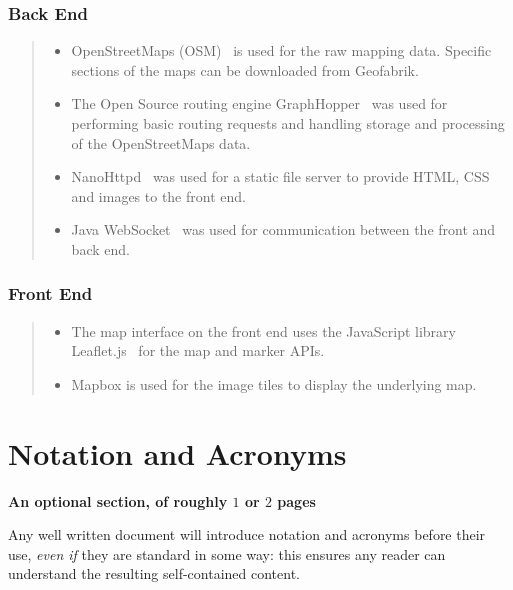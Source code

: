 \documentclass[ draft,
                    author={Alexander Hill},
                supervisor={Dr. Benjamin Sach},
                    degree={MEng},
                     title={MARMOSET: Multi Agent Real-time Multi-core Online
                     Simulation for Efficient Transportation},
                  subtitle={},
                      type={research},
                      year={2016} ]{dissertation}
\begin{document}
\subsection*{Back End}
\begin{quote}
\noindent
\begin{itemize}
    \item OpenStreetMaps (OSM)~\cite{osm} is used for the raw mapping data. Specific sections of
        the maps can be downloaded from Geofabrik.
    \item The Open Source routing engine GraphHopper~\cite{graphhopper} was
        used for performing basic routing requests and handling storage and
        processing of the OpenStreetMaps data.
    \item NanoHttpd~\cite{nanohttpd} was used for a static file server to
        provide HTML, CSS and images to the front end.
    \item Java WebSocket~\cite{javawebsocket} was used for communication
        between the front and back end.
\end{itemize}
\end{quote}

\subsection*{Front End}
\begin{quote}
\noindent
\begin{itemize}
    \item The map interface on the front end uses the JavaScript library
        Leaflet.js~\cite{leaflet} for the map and marker APIs.
    \item Mapbox is used for the image tiles to display the underlying map.
\end{itemize}
\end{quote}



\chapter*{Notation and Acronyms}

{\bf An optional section, of roughly $1$ or $2$ pages}
\vspace{1cm}

\noindent
Any well written document will introduce notation and acronyms before
their use, {\em even if} they are standard in some way: this ensures
any reader can understand the resulting self-contained content.
\end{document}
